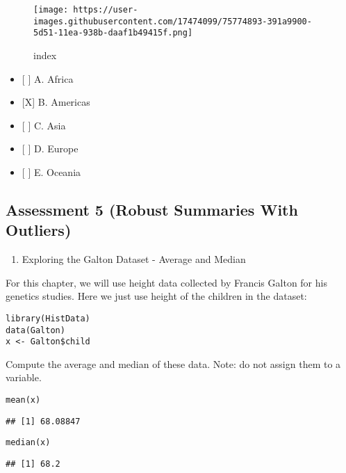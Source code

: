 \documentclass[]{article}
\providecommand{\tightlist}{%
  \setlength{\itemsep}{0pt}\setlength{\parskip}{0pt}}
\begin{document}
\begin{figure}
\centering
\texttt{[image: https://user-images.githubusercontent.com/17474099/75774893-391a9900-5d51-11ea-938b-daaf1b49415f.png]}
\caption{index}
\end{figure}

\begin{itemize}
\tightlist
\item
  {[} {]} A. Africa
\item
  {[}X{]} B. Americas
\item
  {[} {]} C. Asia
\item
  {[} {]} D. Europe
\item
  {[} {]} E. Oceania
\end{itemize}

\hypertarget{assessment-5-robust-summaries-with-outliers}{%
\subsection{Assessment 5 (Robust Summaries With
Outliers)}\label{assessment-5-robust-summaries-with-outliers}}

\begin{enumerate}
\def\labelenumi{\arabic{enumi}.}
\tightlist
\item
  Exploring the Galton Dataset - Average and Median
\end{enumerate}

For this chapter, we will use height data collected by Francis Galton
for his genetics studies. Here we just use height of the children in the
dataset:

\begin{verbatim}
library(HistData)
data(Galton)
x <- Galton$child
\end{verbatim}

Compute the average and median of these data. Note: do not assign them
to a variable.

\begin{verbatim}
mean(x)
\end{verbatim}

\begin{verbatim}
## [1] 68.08847
\end{verbatim}

\begin{verbatim}
median(x)
\end{verbatim}

\begin{verbatim}
## [1] 68.2
\end{verbatim}
\end{document}
